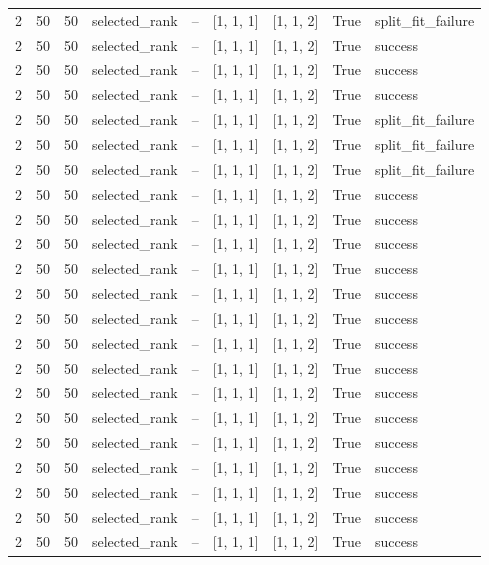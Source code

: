 \begin{longtable}{lllllllll}
2 & 50 & 50 & selected\_rank & -- & [1, 1, 1] & [1, 1, 2] & True & split\_fit\_failure \\
2 & 50 & 50 & selected\_rank & -- & [1, 1, 1] & [1, 1, 2] & True & success \\
2 & 50 & 50 & selected\_rank & -- & [1, 1, 1] & [1, 1, 2] & True & success \\
2 & 50 & 50 & selected\_rank & -- & [1, 1, 1] & [1, 1, 2] & True & success \\
2 & 50 & 50 & selected\_rank & -- & [1, 1, 1] & [1, 1, 2] & True & split\_fit\_failure \\
2 & 50 & 50 & selected\_rank & -- & [1, 1, 1] & [1, 1, 2] & True & split\_fit\_failure \\
2 & 50 & 50 & selected\_rank & -- & [1, 1, 1] & [1, 1, 2] & True & split\_fit\_failure \\
2 & 50 & 50 & selected\_rank & -- & [1, 1, 1] & [1, 1, 2] & True & success \\
2 & 50 & 50 & selected\_rank & -- & [1, 1, 1] & [1, 1, 2] & True & success \\
2 & 50 & 50 & selected\_rank & -- & [1, 1, 1] & [1, 1, 2] & True & success \\
2 & 50 & 50 & selected\_rank & -- & [1, 1, 1] & [1, 1, 2] & True & success \\
2 & 50 & 50 & selected\_rank & -- & [1, 1, 1] & [1, 1, 2] & True & success \\
2 & 50 & 50 & selected\_rank & -- & [1, 1, 1] & [1, 1, 2] & True & success \\
2 & 50 & 50 & selected\_rank & -- & [1, 1, 1] & [1, 1, 2] & True & success \\
2 & 50 & 50 & selected\_rank & -- & [1, 1, 1] & [1, 1, 2] & True & success \\
2 & 50 & 50 & selected\_rank & -- & [1, 1, 1] & [1, 1, 2] & True & success \\
2 & 50 & 50 & selected\_rank & -- & [1, 1, 1] & [1, 1, 2] & True & success \\
2 & 50 & 50 & selected\_rank & -- & [1, 1, 1] & [1, 1, 2] & True & success \\
2 & 50 & 50 & selected\_rank & -- & [1, 1, 1] & [1, 1, 2] & True & success \\
2 & 50 & 50 & selected\_rank & -- & [1, 1, 1] & [1, 1, 2] & True & success \\
2 & 50 & 50 & selected\_rank & -- & [1, 1, 1] & [1, 1, 2] & True & success \\
2 & 50 & 50 & selected\_rank & -- & [1, 1, 1] & [1, 1, 2] & True & success \\

\end{longtable}
